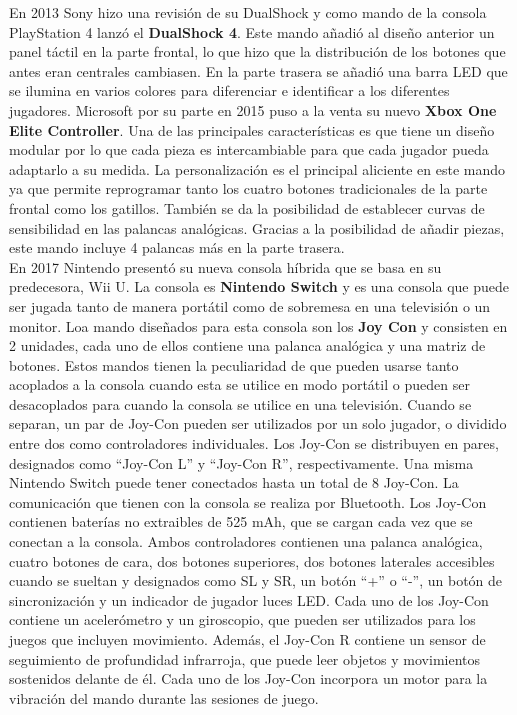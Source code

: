 En 2013 Sony hizo una revisi\'on de su DualShock y como mando de la consola PlayStation 4 lanz\'o el \textbf{DualShock 4}. Este mando a\~nadi\'o al dise\~no anterior un panel t\'actil en la parte frontal, lo que hizo que la distribuci\'on de los botones que antes eran centrales cambiasen. En la parte trasera se a\~nadi\'o una barra LED que se ilumina en varios colores para diferenciar e identificar a los diferentes jugadores. Microsoft por su parte en 2015 puso a la venta su nuevo \textbf{Xbox One Elite Controller}. Una de las principales caracter\'isticas es que tiene un dise\~no modular por lo que cada pieza es intercambiable para que cada jugador pueda adaptarlo a su medida. La personalizaci\'on es el principal aliciente en este mando ya que permite reprogramar tanto los cuatro botones tradicionales de la parte frontal como los gatillos. Tambi\'en se da la posibilidad de establecer curvas de sensibilidad en las palancas anal\'ogicas. Gracias a la posibilidad de a\~nadir piezas, este mando incluye 4 palancas m\'as en la parte trasera.\\

En 2017 Nintendo present\'o su nueva consola h\'ibrida que se basa en su predecesora, Wii U. La consola es \textbf{Nintendo Switch} y es una consola que puede ser jugada tanto de manera port\'atil como de sobremesa en una televisi\'on o un monitor. Loa mando dise\~nados para esta consola son los \textbf{Joy Con} y consisten en 2 unidades, cada uno de ellos contiene una palanca anal\'ogica y una matriz de botones. Estos mandos tienen la peculiaridad de que pueden usarse tanto acoplados a la consola cuando esta se utilice en modo port\'atil o pueden ser desacoplados para cuando la consola se utilice en una televisi\'on. Cuando se separan, un par de Joy-Con pueden ser utilizados por un solo jugador, o dividido entre dos como controladores individuales. Los Joy-Con se distribuyen en pares, designados como ``Joy-Con L'' y ``Joy-Con R'', respectivamente. Una misma Nintendo Switch puede tener conectados hasta un total de 8 Joy-Con. La comunicaci\'on que tienen con la consola se realiza por Bluetooth. Los Joy-Con contienen bater\'ias no extraibles de 525 mAh, que se cargan cada vez que se conectan a la consola. Ambos controladores contienen una palanca anal\'ogica, cuatro botones de cara, dos botones superiores, dos botones laterales accesibles cuando se sueltan y designados como SL y SR, un bot\'on ``+'' o ``-'', un bot\'on de sincronizaci\'on y un indicador de jugador luces LED. Cada uno de los Joy-Con contiene un aceler\'ometro y un giroscopio, que pueden ser utilizados para los juegos que incluyen movimiento. Adem\'as, el Joy-Con R contiene un sensor de seguimiento de profundidad infrarroja, que puede leer objetos y movimientos sostenidos delante de \'el. Cada uno de los Joy-Con incorpora un motor para la vibraci\'on del mando durante las sesiones de juego.\\

